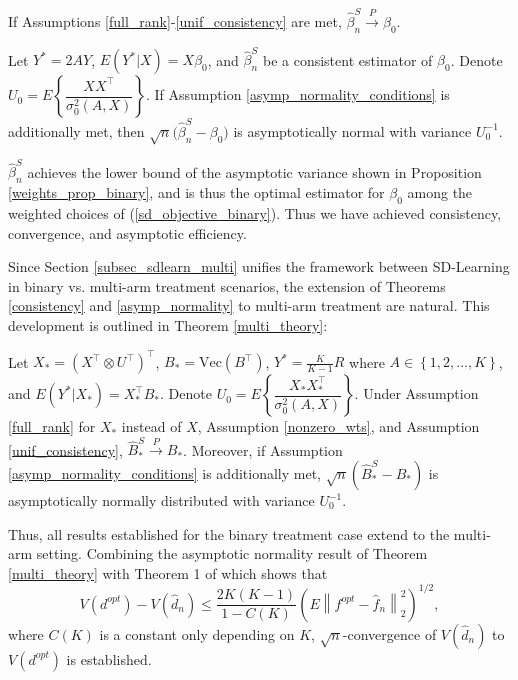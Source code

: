 \documentclass[useAMS,usenatbib]{biom}
\begin{document}
\begin{theorem} \label{consistency}
If Assumptions \ref{full_rank}-\ref{unif_consistency} are met, $\hat{\beta}_n^{S} \overset{P}{\rightarrow} \beta_0$.
\end{theorem}

\begin{theorem} \label{asymp_normality}
Let $Y^* = 2AY$, $E(Y^*|X) = X\beta_0$, and $\hat{\beta}_n^S$ be a consistent estimator of $\beta_0$. Denote $U_0 = E \left\{ \dfrac{XX^{\top}}{\sigma_0^2 \left(A, X \right)} \right\}$. If Assumption \ref{asymp_normality_conditions} is additionally met, then $\sqrt{n} \big( 
\hat{\beta}_n^S - \beta_0 \big)$ is asymptotically normal with variance $U_0^{-1}$.
\end{theorem}

$\hat{\beta}_n^S$ achieves the lower bound of the asymptotic variance shown in Proposition \ref{weights_prop_binary}, and is thus the optimal estimator for $\beta_0$ among the weighted choices of (\ref{sd_objective_binary}). Thus we have achieved consistency, convergence, and asymptotic efficiency.

Since Section \ref{subsec_sdlearn_multi} unifies the framework between SD-Learning in binary vs. multi-arm treatment scenarios, the extension of Theorems \ref{consistency} and \ref{asymp_normality} to multi-arm treatment are natural. This development is outlined in Theorem \ref{multi_theory}:

\begin{theorem} \label{multi_theory}
Let $X_* = \left(X^{\top} \otimes U^{\top} \right)^{\top}$, $B_* = \mbox{Vec} \left( B^{\top} \right)$, $Y^* = \frac{K}{K-1}R$ where $A \in \left\{ 1, 2, ..., K \right\}$, and $E\left( Y^* | X_* \right) = X_*^{\top} B_*$. Denote $U_0 = E \left\{ \dfrac{X_* X_*^{\top}}{\sigma_0^2 \left(A, X \right)} \right\}$. Under Assumption \ref{full_rank} for $X_*$ instead of $X$, Assumption \ref{nonzero_wts}, and Assumption \ref{unif_consistency}, $\hat{B}_*^S \overset{P}{\rightarrow} B_*$. Moreover, if Assumption \ref{asymp_normality_conditions} is additionally met, $\sqrt{n} \left( \hat{B}_*^S - B_* \right)$ is asymptotically normally distributed with variance $U_0^{-1}$.
\end{theorem}

Thus, all results established for the binary treatment case extend to the multi-arm setting. Combining the asymptotic normality result of Theorem \ref{multi_theory} with Theorem 1 of \cite{qi_multi-armed_2020} which shows that
\begin{equation*}
    V(d^{opt}) - V(\hat{d}_n) \leq \dfrac{2K(K-1)}{1-C(K)} \left( E \left\| f^{opt} - \hat{f}_n \right\|_2^2 \right)^{1/2},
\end{equation*}
 where $C(K)$ is a constant only depending on $K$, $\sqrt{n}$-convergence of $V(\hat{d}_n)$ to $V(d^{opt})$ is established.
 
\end{document}
